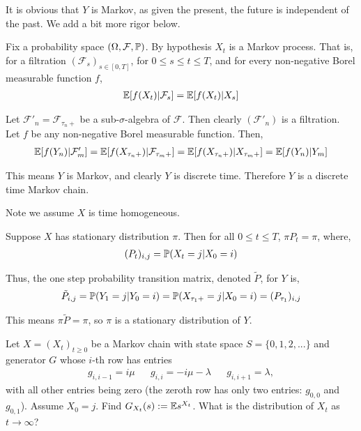 \begin{solution}
It is obvious that \( Y \) is Markov, as given the present, the future is independent of the past. We add a bit more rigor below.

Fix a probability space \( (\Omega, \mathcal{F}, \mathbb{P}) \).
By hypothesis \( X_t \) is a Markov process. That is, for a filtration \( (\mathcal{F}_s)_{s\in[0,T]} \), for \( 0\leq s\leq t\leq T \), and for every non-negative Borel measurable function \( f \), 
\begin{align*}
    \mathbb{E}[f(X_t) | \mathcal{F}_s] = \mathbb{E}[f(X_t)|X_s]
\end{align*}

Let \( \mathcal{F}'_n = \mathcal{F}_{\tau_n+} \) be a sub-\( \sigma \)-algebra of \( \mathcal{F} \). Then clearly \( (\mathcal{F}'_n) \) is a filtration. Let \( f \) be any non-negative Borel measurable function. Then,
\begin{align*}
    \mathbb{E}[f(Y_n) | \mathcal{F}'_m] = \mathbb{E}[f(X_{\tau_n+}) | \mathcal{F}_{\tau_m+}] = \mathbb{E}[f(X_{\tau_n+}) | X_{\tau_m+}] = \mathbb{E}[f(Y_n) | Y_m]
\end{align*}

This means \( Y \) is Markov, and clearly \( Y \) is discrete time. Therefore \( Y \) is a discrete time Markov chain.



Note we assume \( X \) is time homogeneous.

Suppose \( X \) has stationary distribution \( \pi \). Then for all \( 0\leq t \leq T \), \( \pi P_t = \pi \), where,
\begin{align*}
    (P_t)_{i,j} = \mathbb{P}(X_t = j | X_0 = i)
\end{align*}

Thus, the one step probability transition matrix, denoted \( \tilde{P} \), for \( Y \) is,
\begin{align*}
    \tilde{P}_{i,j} = \mathbb{P}(Y_1=j | Y_0 = i) = \mathbb{P}( X_{\tau_1+}=j | X_0 = i) = (P_{\tau_1})_{i,j}
\end{align*}

This means \( \pi \tilde{P} = \pi \), so \( \pi \) is a stationary distribution of \( Y \).
\end{solution}

\begin{problem}[Exercise 5.3]
    Let \( X=(X_t)_{t\geq 0} \) be a Markov chain with state space \( S=\{0,1,2,...\} \) and generator \( G \) whose \( i \)-th row has entries
    \begin{align*}
        g_{i,i-1} = i\mu && g_{i,i} = -i\mu-\lambda && g_{i,i+1} = \lambda,
    \end{align*}
    with all other entries being zero (the zeroth row has only two entries: \( g_{0,0} \) and \( g_{0,1} \)). Assume \( X_0=j \). Find \( G_{X_t}(s) := \mathbb{E} s^{X_t} \). What is the distribution of \( X_t \) as \( t\to\infty \)?
\end{problem}

